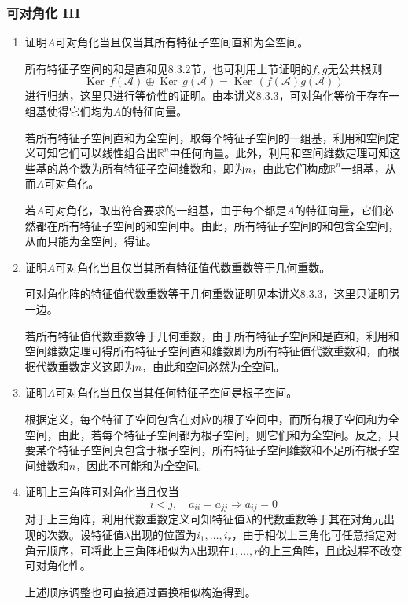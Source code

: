 \documentclass[a4paper,UTF8,fontset=windows]{ctexart}
\DeclareMathOperator{\Ker}{Ker\,}
\newcommand*{\ma}{\mathcal{A}}
\newcommand*{\note}{\noindent *}
\begin{document}
\subsubsection{可对角化 III}
\begin{enumerate}
    \item 证明$A$可对角化当且仅当其所有特征子空间直和为全空间。
    
    所有特征子空间的和是直和见8.3.2节，也可利用上节证明的$f,g$无公共根则
    $$\Ker f(\ma)\oplus\Ker g(\ma)=\Ker(f(\ma)g(\ma))$$
    进行归纳，这里只进行等价性的证明。由本讲义8.3.3，可对角化等价于存在一组基使得它们均为$A$的特征向量。

    若所有特征子空间直和为全空间，取每个特征子空间的一组基，利用和空间定义可知它们可以线性组合出$\mathbb{R}^n$中任何向量。此外，利用和空间维数定理可知这些基的总个数为所有特征子空间维数和，即为$n$，由此它们构成$\mathbb{R}^n$一组基，从而$A$可对角化。

    若$A$可对角化，取出符合要求的一组基，由于每个都是$A$的特征向量，它们必然都在所有特征子空间的和空间中。由此，所有特征子空间的和包含全空间，从而只能为全空间，得证。

    \item 证明$A$可对角化当且仅当其所有特征值代数重数等于几何重数。
    
    可对角化阵的特征值代数重数等于几何重数证明见本讲义8.3.3，这里只证明另一边。

    若所有特征值代数重数等于几何重数，由于所有特征子空间和是直和，利用和空间维数定理可得所有特征子空间直和维数即为所有特征值代数重数和，而根据代数重数定义这即为$n$，由此和空间必然为全空间。
    
    \item 证明$A$可对角化当且仅当其任何特征子空间是根子空间。
    
    根据定义，每个特征子空间包含在对应的根子空间中，而所有根子空间和为全空间，由此，若每个特征子空间都为根子空间，则它们和为全空间。反之，只要某个特征子空间真包含于根子空间，所有特征子空间维数和不足所有根子空间维数和$n$，因此不可能和为全空间。
    
    \item 证明上三角阵可对角化当且仅当
    $$i<j,\quad a_{ii}=a_{jj}\Longrightarrow a_{ij}=0$$
    对于上三角阵，利用代数重数定义可知特征值$\lambda$的代数重数等于其在对角元出现的次数。设特征值$\lambda$出现的位置为$i_1,\dots,i_r$，由于相似上三角化可任意指定对角元顺序，可将此上三角阵相似为$\lambda$出现在$1,\dots,r$的上三角阵，且此过程不改变可对角化性。

    \note 上述顺序调整也可直接通过置换相似构造得到。


\end{enumerate}
\end{document}

